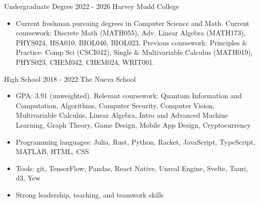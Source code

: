 \documentclass[9pt]{resume}
\begin{document}
    \vspace{-0.4cm}
    \begin{experiencelist}
        \experience 
            {Undergraduate Degree}
            {2022 - 2026}
            {Harvey Mudd College}
            {\begin{itemize}[noitemsep, topsep=1pt]
                \item[] {Current freshman pursuing degrees in Computer Science and Math. Current coursework: Discrete Math (MATH055), Adv. Linear Algebra (MATH173), PHYS024, HSA010, BIOL046, BIOL023. Previous coursework: Principles \& Practice: Comp Sci (CSCI042), Single \& Multivariable Calculus (MATH019), PHYS023, CHEM042, CHEM024, WRIT001.}
            \end{itemize}}
        \experience
            {High School}
            {2018 - 2022}
            {The Nueva School}
            {\begin{itemize}[noitemsep, topsep=1pt]
                \item[] GPA: 3.91 (unweighted). Relevant coursework: Quantum Information and Computation, Algorithms, Computer Security, Computer Vision, Multivariable Calculus, Linear Algebra, Intro and Advanced Machine Learning, Graph Theory, Game Design, Mobile App Design, Cryptocurrency
            \end{itemize}}
    \end{experiencelist}
    \vspace{-0.4cm}
    \begin{itemize}[noitemsep, topsep=0pt]
        \item Programming languages: Julia, Rust, Python, Racket, JavaScript, TypeScript, MATLAB, HTML, CSS
        \item Tools: git, TensorFlow, Pandas, React Native, Unreal Engine, Svelte, Tauri, d3, Yew
        \item Strong leadership, teaching, and teamwork skills
    \end{itemize}
\end{document}

